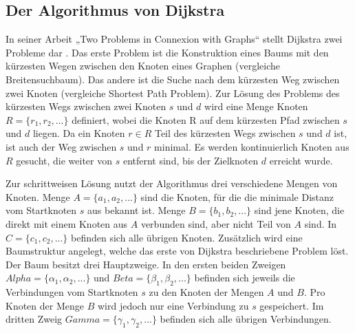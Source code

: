 \subsection{Der Algorithmus von Dijkstra}
In seiner Arbeit „Two Problems in Connexion with Graphs“ stellt Dijkstra zwei Probleme dar \cite{Dijkstra.1959}. Das erste Problem ist die Konstruktion eines Baums mit den kürzesten Wegen zwischen den Knoten eines Graphen (vergleiche Breitensuchbaum). Das andere ist die Suche nach dem kürzesten Weg zwischen zwei Knoten (vergleiche Shortest Path Problem).
Zur Lösung des Problems des kürzesten Wegs zwischen zwei Knoten $s$ und $d$ wird eine Menge Knoten $R = \{r_1, r_2, ...\}$ definiert, wobei die Knoten R auf dem kürzesten Pfad zwischen $s$ und $d$ liegen. %
Da ein Knoten $r \in R$ Teil des kürzesten Wegs zwischen $s$ und $d$ ist, ist auch der Weg zwischen $s$ und $r$ minimal. Es werden kontinuierlich Knoten aus $R$ gesucht, die weiter von $s$ entfernt sind, bis der Zielknoten $d$ erreicht wurde.

Zur schrittweisen Lösung nutzt der Algorithmus drei verschiedene Mengen von Knoten. Menge $A = \{a_1, a_2, ...\}$ sind die Knoten, für die die minimale Distanz vom Startknoten $s$ aus bekannt ist. Menge $B = \{b_1, b_2, ...\}$ sind jene Knoten, die direkt mit einem Knoten aus $A$ verbunden sind, aber nicht Teil von $A$ sind. In $C = \{c_1, c_2, ...\}$ befinden sich alle übrigen Knoten.
Zusätzlich wird eine Baumstruktur angelegt, welche das erste von Dijkstra beschriebene Problem löst. Der Baum besitzt drei Hauptzweige. In den ersten beiden Zweigen $Alpha = \{\alpha_1, \alpha_2, ...\}$ und $Beta = \{\beta_1, \beta_2, ...\}$ befinden sich jeweils die Verbindungen vom Startknoten $s$ zu den Knoten der Mengen $A$ und $B$. Pro Knoten der Menge $B$ wird jedoch nur eine Verbindung zu $s$ gespeichert. Im dritten Zweig $Gamma = \{\gamma_1, \gamma_2, ...\}$ befinden sich alle übrigen Verbindungen. 

